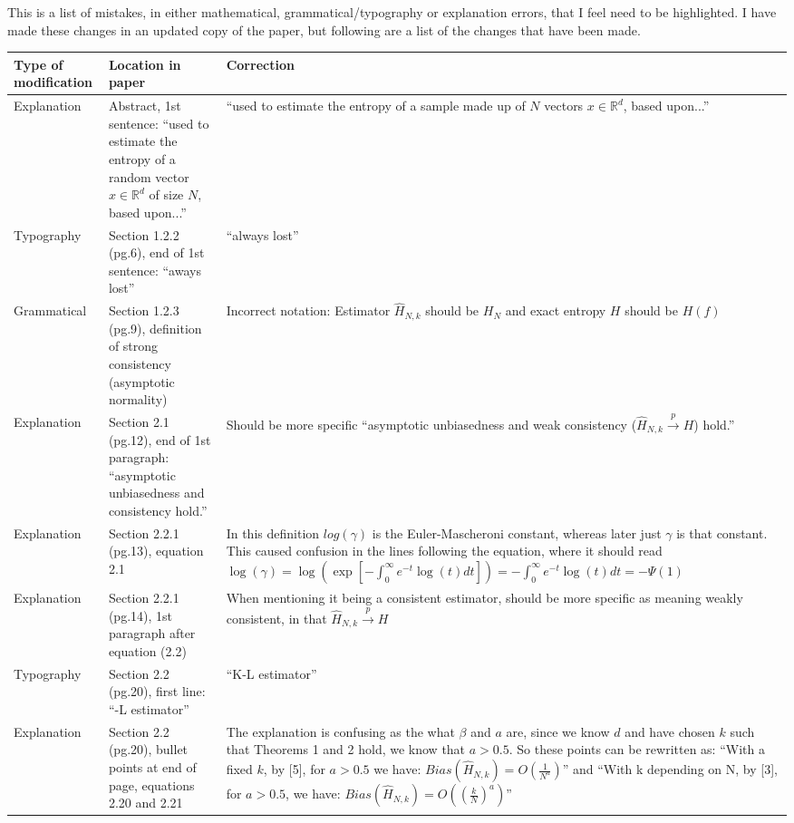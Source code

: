 \documentclass[11pt]{report}
\begin{document}
This is a list of mistakes, in either mathematical, grammatical/typography or explanation errors, that I feel need to be highlighted. I have made these changes in an updated copy of the paper, but following are a list of the changes that have been made.

\begin{longtable}{| p{23mm} | p{52mm}| p{70mm}|}  
\toprule
\textbf{Type of \newline modification} & \textbf{Location in paper} & \textbf{Correction} \\
\midrule[1pt]
Explanation & Abstract, 1st sentence: \newline ``used to estimate the entropy of a random vector $x \in \mathbb{R}^d$ of size $N$, based upon...'' &  ``used to estimate the entropy of a sample made up of $N$ vectors $x \in \mathbb{R}^d$, based upon...'' \\
Typography & Section 1.2.2 (pg.6), end of 1st sentence: ``aways lost'' & ``always lost'' \\
Grammatical & Section 1.2.3 (pg.9), definition of strong consistency (asymptotic normality) & Incorrect notation: Estimator $\hat{H}_{N,k}$ should be $H_{N}$ and exact entropy $H$ should be $H(f)$ \\
Explanation & Section 2.1 (pg.12), end of 1st paragraph: \newline ``asymptotic unbiasedness and consistency hold.'' & Should be more specific ``asymptotic unbiasedness and weak consistency ($\hat{H}_{N, k} \xrightarrow{p} H$) hold.'' \\
Explanation & Section 2.2.1 (pg.13), equation 2.1 & In this definition $log(\gamma)$ is the Euler-Mascheroni constant, whereas later just $\gamma$ is that constant. This caused confusion in the lines following the equation, where it should read \newline $\log (\gamma) = \log \left( \exp \left[ - \int_{0}^{\infty} e^{-t} \log(t) dt \right] \right) = - \int_{0}^{\infty} e^{-t} \log(t) dt  = -\Psi(1)$\\
Explanation & Section 2.2.1 (pg.14), 1st paragraph after equation (2.2) & When mentioning it being a consistent estimator, should be more specific as meaning weakly consistent, in that $\hat{H}_{N, k} \xrightarrow{p} H$ \\
Typography & Section 2.2 (pg.20), first line: \newline ``-L estimator''  & ``K-L estimator'' \\
Explanation & Section 2.2 (pg.20), bullet points at end of page, equations 2.20 and 2.21 & The explanation is confusing as the what $\beta$ and $a$ are, since we know $d$ and have chosen $k$ such that Theorems 1 and 2 hold, we know that $a >0.5$. So these points can be rewritten as: ``With a fixed $k$, by [5], for $a >0.5$ we have: $Bias(\hat{H}_{N, k})= O \left( \frac{1}{N^{a}} \right)$'' and ``With k depending on N, by [3], for $a >0.5$, we have: $Bias(\hat{H}_{N, k}) = O\left( \left( \frac{k}{N} \right)^{a} \right)$''\\

\end{longtable}
\end{document}
